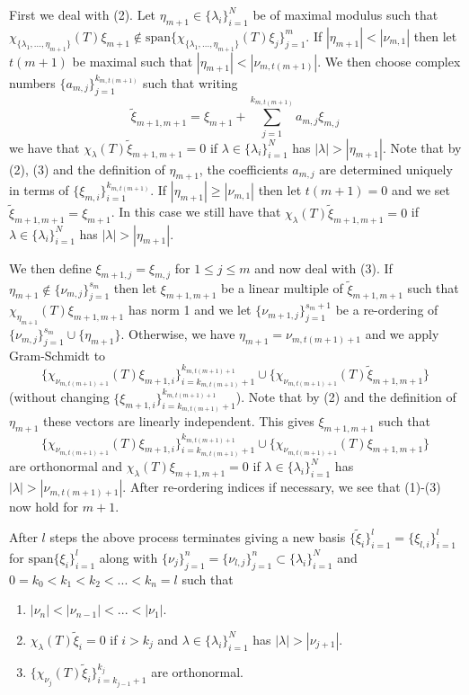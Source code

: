 \documentclass[a4paper,10pt]{article}
\begin{document}
First we deal with (2). Let $\eta_{m+1}\in\{\lambda_i\}_{i=1}^N$ be of maximal modulus such that $\chi_{\{\lambda_1,...,\eta_{m+1}\}}(T)\xi_{m+1}\notin\mathrm{span}\{\chi_{\{\lambda_1,...,\eta_{m+1}\}}(T)\xi_{j}\}_{j=1}^{m}$. If $\left|\eta_{m+1}\right|<\left|\nu_{m,1}\right|$ then let $t({m+1})$ be maximal such that $\left|\eta_{m+1}\right|<\left|\nu_{m,t({m+1})}\right|$. We then choose complex numbers $\{a_{m,j}\}_{j=1}^{k_{m,t({m+1})}}$ such that writing
$$
\tilde \xi_{m+1,m+1}=\xi_{m+1}+\sum_{j=1}^{k_{m,t({m+1})}}a_{m,j}\xi_{m,j}
$$
we have that $\chi_{\lambda}(T)\tilde \xi_{m+1,m+1}=0$ if $\lambda\in\{\lambda_i\}_{i=1}^N$ has $\left|\lambda\right|>\left|\eta_{m+1}\right|$. Note that by (2), (3) and the definition of $\eta_{m+1}$, the coefficients $a_{m,j}$ are determined uniquely in terms of $\{\xi_{m,i}\}_{i=1}^{k_{m,t({m+1})}}$. If $\left|\eta_{m+1}\right|\geq\left|\nu_{m,1}\right|$ then let $t({m+1})=0$ and we set $\tilde \xi_{m+1,m+1}=\xi_{m+1}$. In this case we still have that $\chi_{\lambda}(T)\tilde \xi_{m+1,m+1}=0$ if $\lambda\in\{\lambda_i\}_{i=1}^N$ has $\left|\lambda\right|>\left|\eta_{m+1}\right|$.



We then define $\xi_{m+1,j}=\xi_{m,j}$ for $1\leq j\leq m$ and now deal with (3). If $\eta_{m+1}\notin\{\nu_{m,j}\}_{j=1}^{s_m}$ then let $\xi_{m+1,m+1}$ be a linear multiple of $\tilde \xi_{m+1,m+1}$ such that $\chi_{\eta_{m+1}}(T)\xi_{m+1,m+1}$ has norm 1 and we let $\{\nu_{m+1,j}\}_{j=1}^{s_m+1}$ be a re-ordering of $\{\nu_{m,j}\}_{j=1}^{s_m}\cup\{\eta_{m+1}\}$. Otherwise, we have $\eta_{m+1}=\nu_{m,t({m+1})+1}$ and we apply Gram-Schmidt to
$$
\{\chi_{\nu_{m,t({m+1})+1}}(T)\xi_{m+1,i}\}_{i=k_{m,t({m+1})}+1}^{k_{m,t({m+1})+1}}\cup\{\chi_{\nu_{m,t({m+1})+1}}(T)\tilde\xi_{m+1,m+1}\}
$$
(without changing $\{\xi_{m+1,i}\}_{i=k_{m,t({m+1})}+1}^{k_{m,t({m+1})+1}}$). Note that by (2) and the definition of $\eta_{m+1}$ these vectors are linearly independent. This gives $\xi_{m+1,m+1}$ such that
$$
\{\chi_{\nu_{m,t({m+1})+1}}(T)\xi_{m+1,i}\}_{i=k_{m,t({m+1})}+1}^{k_{m,t({m+1})+1}}\cup\{\chi_{\nu_{m,t({m+1})+1}}(T)\xi_{m+1,m+1}\}
$$
are orthonormal and $\chi_{\lambda}(T)\xi_{m+1,m+1}=0$ if $\lambda\in\{\lambda_i\}_{i=1}^N$ has $\left|\lambda\right|>\left|\nu_{m,t({m+1})+1}\right|.$ After re-ordering indices if necessary, we see that (1)-(3) now hold for $m+1$.

After $l$ steps the above process terminates giving a new basis $\{\tilde\xi_i\}_{i=1}^l=\{\xi_{l,i}\}_{i=1}^l$ for $\mathrm{span}\{\xi_{i}\}_{i=1}^l$ along with $\{\nu_{j}\}_{j=1}^n=\{\nu_{l,j}\}_{j=1}^n\subset\{\lambda_i\}_{i=1}^N$ and $0=k_0<k_1<k_2<...<k_n=l$ such that
\begin{enumerate}
  \item[(i)] $\left|\nu_{n}\right|<\left|\nu_{n-1}\right|<...<\left|\nu_{1}\right|.$
	\item[(ii)] $\chi_{\lambda}(T)\tilde\xi_{i}=0$ if $i>k_{j}$ and $\lambda\in\{\lambda_i\}_{i=1}^N$ has $\left|\lambda\right|>\left|\nu_{j+1}\right|$.
	\item[(iii)] $\{\chi_{\nu_{j}}(T)\tilde\xi_{i}\}_{i=k_{j-1}+1}^{k_{j}}$ are orthonormal.
\end{enumerate}
\end{document}
